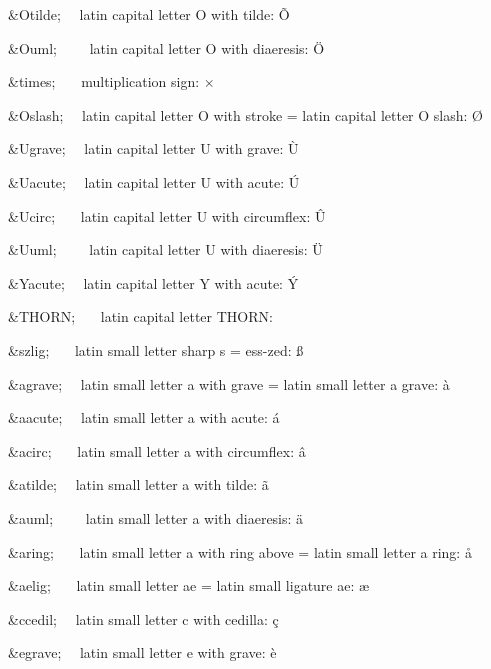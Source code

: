 \begin{DoxyItemize}
\item {\ttfamily \&Otilde;}{\ttfamily ~~} latin capital letter O with tilde\+: \~{O} 
\item {\ttfamily \&Ouml;}{\ttfamily ~~~~} latin capital letter O with diaeresis\+: \"{O} 
\item {\ttfamily \&times;}{\ttfamily ~~~} multiplication sign\+: {$\times$} 
\item {\ttfamily \&Oslash;}{\ttfamily ~~} latin capital letter O with stroke = latin capital letter O slash\+: {\O} 
\item {\ttfamily \&Ugrave;}{\ttfamily ~~} latin capital letter U with grave\+: \`{U} 
\item {\ttfamily \&Uacute;}{\ttfamily ~~} latin capital letter U with acute\+: \'{U} 
\item {\ttfamily \&Ucirc;}{\ttfamily ~~~} latin capital letter U with circumflex\+: \^{U} 
\item {\ttfamily \&Uuml;}{\ttfamily ~~~~} latin capital letter U with diaeresis\+: \"{U} 
\item {\ttfamily \&Yacute;}{\ttfamily ~~} latin capital letter Y with acute\+: \'{Y} 
\item {\ttfamily \&T\+H\+O\+RN;}{\ttfamily ~~~} latin capital letter T\+H\+O\+RN\+: \TH 
\item {\ttfamily \&szlig;}{\ttfamily ~~~} latin small letter sharp s = ess-\/zed\+: {\ss} 
\item {\ttfamily \&agrave;}{\ttfamily ~~} latin small letter a with grave = latin small letter a grave\+: \`{a} 
\item {\ttfamily \&aacute;}{\ttfamily ~~} latin small letter a with acute\+: \'{a} 
\item {\ttfamily \&acirc;}{\ttfamily ~~~} latin small letter a with circumflex\+: \^{a} 
\item {\ttfamily \&atilde;}{\ttfamily ~~} latin small letter a with tilde\+: \~{a} 
\item {\ttfamily \&auml;}{\ttfamily ~~~~} latin small letter a with diaeresis\+: \"{a} 
\item {\ttfamily \&aring;}{\ttfamily ~~~} latin small letter a with ring above = latin small letter a ring\+: \aa 
\item {\ttfamily \&aelig;}{\ttfamily ~~~} latin small letter ae = latin small ligature ae\+: {\ae} 
\item {\ttfamily \&ccedil;}{\ttfamily ~~} latin small letter c with cedilla\+: \c{c} 
\item {\ttfamily \&egrave;}{\ttfamily ~~} latin small letter e with grave\+: \`{e} 

\end{DoxyItemize}
